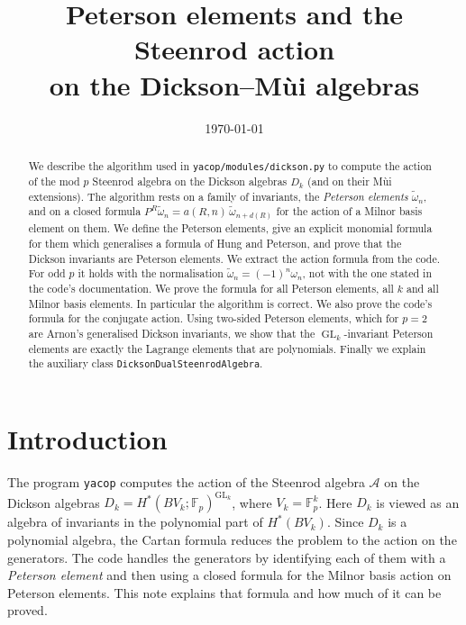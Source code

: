 \documentclass[11pt]{amsart}
\title[Peterson elements and the Dickson--M\`ui algebras]{Peterson elements and the Steenrod action\\ on the Dickson--M\`ui algebras}
\date{\today}
\theoremstyle{definition}
\theoremstyle{remark}
\newcommand{\F}{\mathbb{F}_p}
\newcommand{\A}{\mathcal{A}}
\newcommand{\Dk}{D_k}
\newcommand{\wt}{\widetilde{\omega}}
\newcommand{\code}[1]{\texttt{#1}}
\DeclareMathOperator{\GL}{GL}
\begin{document}
\sloppy

\begin{abstract}
We describe the algorithm used in \code{yacop/modules/dickson.py} to compute
the action of the mod $p$ Steenrod algebra on the Dickson algebras $D_k$
(and on their M\`ui extensions).  The algorithm rests on a family of
invariants, the \emph{Peterson elements} $\wt_n$, and on a closed formula
$P^R\wt_n = a(R,n)\,\wt_{n+d(R)}$ for the action of a Milnor basis element on
them.  We define the Peterson elements, give an explicit monomial formula for
them which generalises a formula of Hung and Peterson, and prove that the
Dickson invariants are Peterson elements.  We extract the action formula from
the code.  For odd $p$ it holds with the normalisation $\wt_n=(-1)^n\omega_n$,
not with the one stated in the code's documentation.  We prove the formula
for all Peterson elements, all $k$ and all Milnor basis elements.  In
particular the algorithm is correct.  We also prove the code's formula for
the conjugate action.  Using two-sided Peterson elements, which for $p=2$ are
Arnon's generalised Dickson invariants, we show that the $\GL_k$-invariant
Peterson elements are exactly the Lagrange elements that are polynomials.  Finally we explain the auxiliary class
\code{DicksonDualSteenrodAlgebra}.
\end{abstract}

\maketitle

\section{Introduction}

The program \code{yacop} computes the action of the Steenrod algebra $\A$ on
the Dickson algebras
$\Dk=H^*(BV_k;\F)^{\GL_k}$, where $V_k=\F^k$.  Here $\Dk$ is viewed as an
algebra of invariants in the polynomial part of $H^*(BV_k)$.  Since $\Dk$ is a
polynomial algebra, the Cartan formula reduces the problem to the action on
the generators.  The code handles the generators by identifying each of them
with a \emph{Peterson element} and then using a closed formula for the Milnor
basis action on Peterson elements.  This note explains that formula and how
much of it can be proved.
\end{document}
